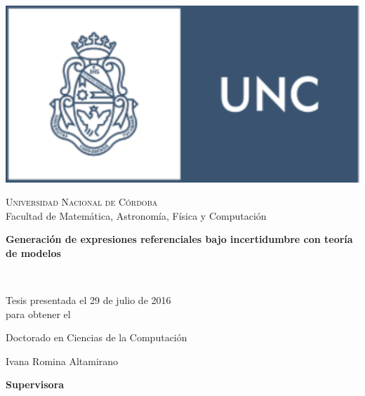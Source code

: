 \pagestyle{plain}
\thispagestyle{empty}
\begin{center}

\includegraphics[scale=.9]{famaf.pdf}
\vspace{4mm}

\textsc{Universidad Nacional de C\'ordoba}\\
Facultad de Matem\'atica, Astronom\'ia, F\'isica y Computaci\'on
\vspace{5mm}
\vspace{15mm}

\begin{Huge}\textbf{Generaci\'on de expresiones referenciales bajo incertidumbre con teor\'ia de modelos}\end{Huge} \\

\vspace{10mm}

Tesis presentada el 29 de julio de 2016 \\ %

para obtener el

\vspace{5mm}

\begin{Large}
Doctorado en Ciencias de la Computaci\'on
\end{Large}

\vspace{10mm}

\begin{LARGE}
Ivana Romina Altamirano 
\end{LARGE}


\vspace{15mm}
\vspace{10mm}

\textbf{Supervisora}
\vspace{5mm}


\end{center}
